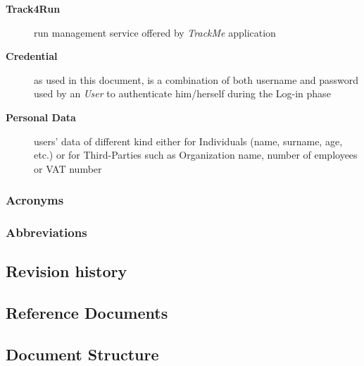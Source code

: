 \documentclass[a4paper]{article}
\begin{document}
\begin{description}
                    \item[\textbf{Track4Run}] run management service offered by \textit{TrackMe} application
                    
                    \item[\textbf{Credential}] as used in this document, is a combination of both username and password used by an \textit{User} to authenticate him/herself during the Log-in phase
                    
                    \item[\textbf{Personal Data}] users' data of different kind either for Individuals (name, surname, age, etc.) or for Third-Parties such as Organization name, number of employees or VAT number
                \end{description}
                
            
            \subsubsection{Acronyms}
            \begin{acronym}
            \end{acronym}
            
            \subsubsection{Abbreviations}



\subsection{Revision history}

\subsection{Reference Documents}

\printbibliography[heading=none]


\newpage

\subsection{Document Structure}
\end{document}
